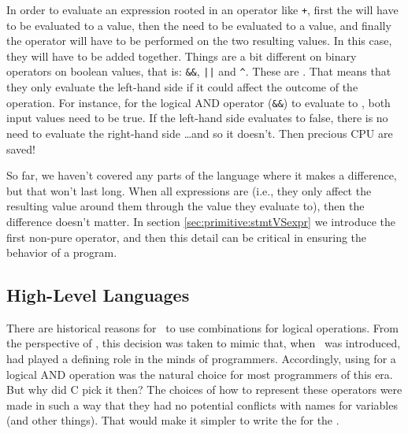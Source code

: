 In order to evaluate an expression rooted in an operator like \texttt{+}, first the  will have to be evaluated to a value, then the  need to be evaluated to a value, and finally the operator will have to be performed on the two resulting values. In this case, they will have to be added together. Things are a bit different on binary operators on boolean values, that is: \texttt{\&\&}, \texttt{||} and \texttt{\^{}}. These are . That means that they only evaluate the left-hand side if it could affect the outcome of the operation. For instance, for the logical AND operator (\texttt{\&\&}) to evaluate to , both input values need to be true. If the left-hand side evaluates to false, there is no need to evaluate the right-hand side \ldots and so it doesn't. Then precious CPU  are saved!

So far, we haven't covered any parts of the language where it makes a difference, but that won't last long. When all expressions are  (i.e., they only affect the resulting value around them through the value they evaluate to), then the difference doesn't matter. In section \ref{sec:primitive:stmtVSexpr} we introduce the first non-pure operator, and then this detail can be critical in ensuring the  behavior of a program.


\subsection{High-Level Languages}

There are historical reasons for \csharp\ to use  combinations for logical operations. From the perspective of \csharp, this decision was taken to mimic  that, when \csharp\ was introduced, had played a defining role in the minds of programmers. Accordingly, using \keywordname{\&\&} for a logical AND operation was the natural choice for most programmers of this era. But why did C pick it then? The choices of how to represent these operators were made in such a way that they had no potential conflicts with names for variables (and other things). That would make it simpler to write the  for the .

